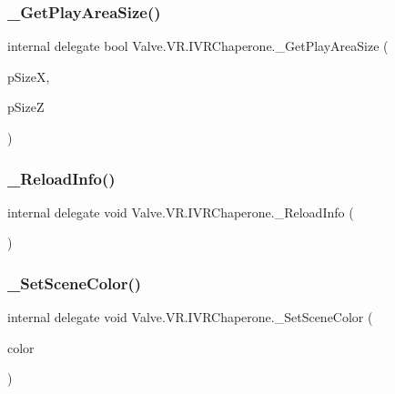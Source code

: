 \mbox{\label{struct_valve_1_1_v_r_1_1_i_v_r_chaperone_a2eada0fcf01f701837846219447de33d}} 
\subsubsection{\texorpdfstring{\_GetPlayAreaSize()}{\_GetPlayAreaSize()}}
{\footnotesize\ttfamily internal delegate bool Valve.\+V\+R.\+I\+V\+R\+Chaperone.\+\_\+\+Get\+Play\+Area\+Size (\begin{DoxyParamCaption}\item[{ref float}]{p\+SizeX,  }\item[{ref float}]{p\+SizeZ }\end{DoxyParamCaption})}

\mbox{\label{struct_valve_1_1_v_r_1_1_i_v_r_chaperone_a8de5e80b3169e3fa61c6bed940006796}} 
\subsubsection{\texorpdfstring{\_ReloadInfo()}{\_ReloadInfo()}}
{\footnotesize\ttfamily internal delegate void Valve.\+V\+R.\+I\+V\+R\+Chaperone.\+\_\+\+Reload\+Info (\begin{DoxyParamCaption}{ }\end{DoxyParamCaption})}

\mbox{\label{struct_valve_1_1_v_r_1_1_i_v_r_chaperone_ac52b4f817e60c163ab42c6fbe71cd116}} 
\subsubsection{\texorpdfstring{\_SetSceneColor()}{\_SetSceneColor()}}
{\footnotesize\ttfamily internal delegate void Valve.\+V\+R.\+I\+V\+R\+Chaperone.\+\_\+\+Set\+Scene\+Color (\begin{DoxyParamCaption}\item[{\mbox{\hyperlink{struct_valve_1_1_v_r_1_1_hmd_color__t}{Hmd\+Color\+\_\+t}}}]{color }\end{DoxyParamCaption})}



